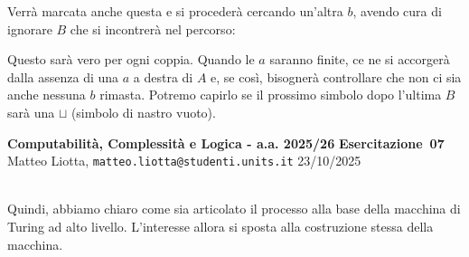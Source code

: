 \documentclass[a4paper,10pt]{article}
\makeatletter
\newcommand{\EsercitazioneNum}{07}
\newcommand{\Data}{23/10/2025}
\newcommand{\DocType}{Esercitazione} %
\newcommand{\FullTitle}{\DocType\ \EsercitazioneNum}
\newcommand{\Header}{
\noindent
  \small \textbf{Computabilità, Complessità e Logica - a.a. 2025/26} \hfill \textbf{\FullTitle} \\[0.2cm]
  \scriptsize Matteo Liotta, \texttt{matteo.liotta@studenti.units.it} \hfill \Data \\[0.2cm]
  \noindent\makebox[\linewidth]{\rule{\linewidth}{0.4pt}} \\[0.3cm]}
\newcommand{\NewPageHeader}{
  \vfill
  \noindent\makebox[\linewidth]{\rule{\linewidth}{0.4pt}}
  \newpage
  {\Header}
}
\makeatother
\begin{document}
{\begin{itemize}[label=, leftmargin=0pt]
\begin{osservazioni}
\begin{center}
    \end{center}
    
    Verrà marcata anche questa e si procederà cercando un'altra $b$, avendo cura di ignorare $B$ che si incontrerà nel percorso:

    \begin{center}
    \end{center}

    Questo sarà vero per ogni coppia. Quando le $a$ saranno finite, ce ne si accorgerà dalla assenza di una $a$ a destra di $A$ e, se così, bisognerà controllare che non ci sia anche nessuna $b$ rimasta. Potremo capirlo se il prossimo simbolo dopo l'ultima $B$ sarà una $\sqcup$ (simbolo di nastro vuoto).
        \begin{center}
    \end{center}

    \end{osservazioni}

    \NewPageHeader

    \begin{osservazioni}
    Quindi, abbiamo chiaro come sia articolato il processo alla base della macchina di Turing ad alto livello. L'interesse allora si sposta alla costruzione stessa della macchina. \\


\end{osservazioni}
\end{itemize}}
\end{document}
